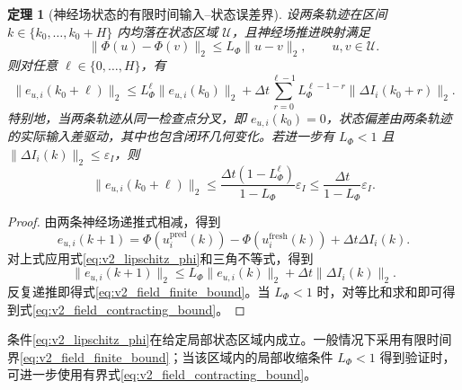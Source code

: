 \documentclass[UTF8,fontset=windows,11pt]{ctexart}
\newtheorem{theorem}{定理}[section]
\begin{document}
\begin{theorem}[神经场状态的有限时间输入--状态误差界]
\label{thm:v2_field_bound}
设两条轨迹在区间 $k\in\{k_0,\ldots,k_0+H\}$ 内均落在状态区域 $\mathcal U$，且神经场推进映射满足
\begin{equation}
 \|\Phi(u)-\Phi(v)\|_2\le L_\Phi\|u-v\|_2,
 \qquad u,v\in\mathcal U.
 \label{eq:v2_lipschitz_phi}
\end{equation}
则对任意 $\ell\in\{0,\ldots,H\}$，有
\begin{equation}
 \|e_{u,i}(k_0+\ell)\|_2
 \le L_\Phi^\ell\|e_{u,i}(k_0)\|_2
 +\Delta t\sum_{r=0}^{\ell-1}
 L_\Phi^{\ell-1-r}\|\Delta I_i(k_0+r)\|_2.
 \label{eq:v2_field_finite_bound}
\end{equation}
特别地，当两条轨迹从同一检查点分叉，即 $e_{u,i}(k_0)=0$，状态偏差由两条轨迹的实际输入差驱动，其中也包含闭环几何变化。若进一步有 $L_\Phi<1$ 且 $\|\Delta I_i(k)\|_2\le\varepsilon_I$，则
\begin{equation}
 \|e_{u,i}(k_0+\ell)\|_2
 \le
 \frac{\Delta t(1-L_\Phi^\ell)}{1-L_\Phi}\varepsilon_I
 \le\frac{\Delta t}{1-L_\Phi}\varepsilon_I.
 \label{eq:v2_field_contracting_bound}
\end{equation}
\end{theorem}

\begin{proof}
由两条神经场递推式相减，得到
\begin{equation}
 e_{u,i}(k+1)=\Phi(u_i^{\mathrm{pred}}(k))-
 \Phi(u_i^{\mathrm{fresh}}(k))+\Delta t\Delta I_i(k).
 \end{equation}
对上式应用式\eqref{eq:v2_lipschitz_phi}和三角不等式，得到
\begin{equation}
 \|e_{u,i}(k+1)\|_2
 \le L_\Phi\|e_{u,i}(k)\|_2+\Delta t\|\Delta I_i(k)\|_2.
\end{equation}
反复递推即得式\eqref{eq:v2_field_finite_bound}。当 $L_\Phi<1$ 时，对等比和求和即可得到式\eqref{eq:v2_field_contracting_bound}。
\end{proof}

条件\eqref{eq:v2_lipschitz_phi}在给定局部状态区域内成立。一般情况下采用有限时间界\eqref{eq:v2_field_finite_bound}；当该区域内的局部收缩条件 $L_\Phi<1$ 得到验证时，可进一步使用有界式\eqref{eq:v2_field_contracting_bound}。
\end{document}
